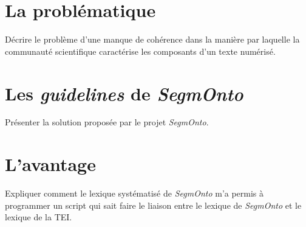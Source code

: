 \documentclass[class=article, crop=false]{standalone}
\begin{document}
	
\section{La problématique}

Décrire le problème d'une manque de cohérence dans la manière par laquelle la communauté scientifique caractérise les composants d'un texte numérisé.

\section{Les \textit{guidelines} de \textit{SegmOnto}}

Présenter la solution proposée par le projet \textit{SegmOnto}.

\section{L'avantage}

Expliquer comment le lexique systématisé de \textit{SegmOnto} m'a permis à programmer un script qui sait faire le liaison entre le lexique de \textit{SegmOnto} et le lexique de la TEI.
	

	
\end{document}
